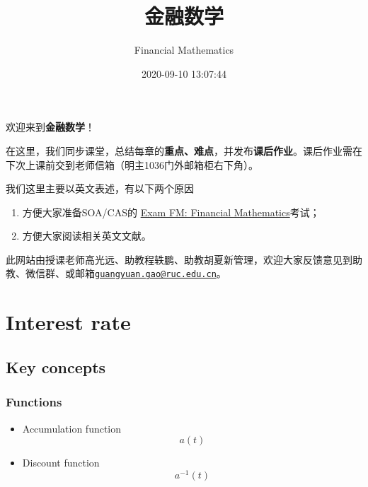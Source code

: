 \documentclass[
]{book}
\title{金融数学}
\author{Financial Mathematics}
\date{2020-09-10 13:07:44}
\begin{document}
\maketitle

{
\setcounter{tocdepth}{1}
\tableofcontents
}
\hypertarget{section}{%
\chapter*{}\label{section}}

欢迎来到\textbf{金融数学}！

在这里，我们同步课堂，总结每章的\textbf{重点、难点}，并发布\textbf{课后作业}。课后作业需在下次上课前交到老师信箱（明主1036门外邮箱柜右下角）。

我们这里主要以英文表述，有以下两个原因

\begin{enumerate}
\def\labelenumi{\arabic{enumi}.}
\item
  方便大家准备SOA/CAS的 \href{https://www.soa.org/education/exam-req/edu-exam-fm-detail/}{Exam FM: Financial Mathematics}考试；
\item
  方便大家阅读相关英文文献。
\end{enumerate}

此网站由授课老师高光远、助教程轶鹏、助教胡夏新管理，欢迎大家反馈意见到助教、微信群、或邮箱\href{mailto:guangyuan.gao@ruc.edu.cn}{\nolinkurl{guangyuan.gao@ruc.edu.cn}}。

\hypertarget{interest-rate}{%
\chapter{Interest rate}\label{interest-rate}}

\hypertarget{key-concepts}{%
\section{Key concepts}\label{key-concepts}}

\hypertarget{functions}{%
\subsection*{Functions}\label{functions}}

\begin{itemize}
\item
  Accumulation function \[a(t)\]
\item
  Discount function \[a^{-1}(t)\]
\end{itemize}
\end{document}
